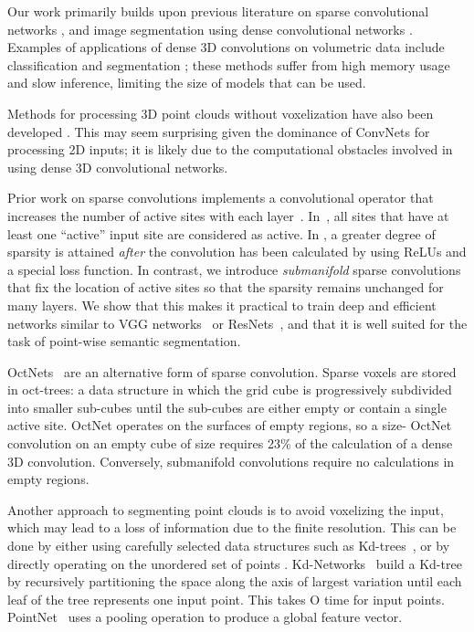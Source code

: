 \documentclass[10pt,twocolumn,letterpaper]{article}
\begin{document}
Our work primarily builds upon previous literature on sparse convolutional networks \cite{engelcke2017vote3deep, graham2015sparse}, and image segmentation using dense convolutional networks \cite{long2015fully, ronneberger2015unet, yu2015multi}.
Examples of applications of dense 3D convolutions on volumetric data include classification \cite{maturana2015voxnet} and segmentation \cite{cciccek20163d}; these methods suffer from high memory usage and slow inference, limiting the size of models that can be used.

Methods for processing 3D point clouds without voxelization have also been developed \cite{klokov2017escape,qi2016pointnet}. This may seem surprising given the dominance of ConvNets for processing 2D inputs; it is likely due to the computational obstacles involved in using dense 3D convolutional networks.

Prior work on sparse convolutions implements a convolutional operator that increases the number of active sites with each layer~\cite{engelcke2017vote3deep,graham2015sparse}. In~\cite{graham2015sparse}, all sites that have at least one ``active'' input site are considered as active. In \cite{engelcke2017vote3deep}, a greater degree of sparsity is attained {\em after} the convolution has been calculated by using ReLUs and a special loss function.
In contrast, we introduce \emph{submanifold} sparse convolutions that fix the location of active sites so that the sparsity remains unchanged for many layers. We show that this makes it practical to train deep and efficient networks similar to VGG networks~\cite{journals/corr/SimonyanZ14a} or ResNets~\cite{he2016deep}, and that it is well suited for the task of point-wise semantic segmentation.

OctNets~\cite{riegler2016octnet} are an alternative form of sparse convolution. Sparse voxels are stored in oct-trees: a data structure in which the grid cube is progressively subdivided into
 smaller sub-cubes until the sub-cubes are either empty or contain a single active site.
OctNet operates on the surfaces of empty regions, so a size- OctNet convolution on an empty cube of size  requires 23\% of the calculation of a dense 3D convolution. Conversely, submanifold convolutions require no calculations in empty regions.


Another approach to segmenting point clouds is to avoid voxelizing the input, which may lead to a loss of information due to the finite resolution. This can be done by either using carefully selected data structures such as Kd-trees~\cite{klokov2017escape}, or by directly operating on the unordered set of points \cite{qi2016pointnet}.
Kd-Networks~\cite{klokov2017escape} build a Kd-tree by recursively partitioning the space along the axis of largest variation until each leaf of the tree represents one input point. This takes O time for  input points.
PointNet~\cite{qi2016pointnet} uses a pooling operation to produce a global feature vector.
\end{document}
